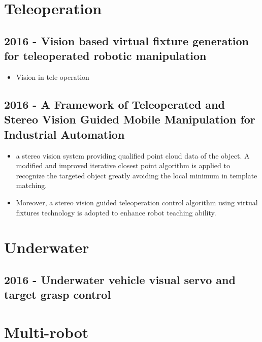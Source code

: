 \section{Teleoperation}
\subsection{2016 - Vision based virtual fixture generation for teleoperated robotic manipulation}
\begin{itemize}
\item Vision in tele-operation 
\end{itemize}

\subsection{2016 - A Framework of Teleoperated and Stereo Vision Guided Mobile Manipulation for Industrial Automation}
\begin{itemize}
\item  a stereo vision system providing qualified point cloud data of the object. A modified and improved iterative closest point algorithm is applied to recognize the targeted object greatly avoiding the local minimum in template matching.
\item Moreover, a stereo vision guided teleoperation control algorithm using virtual fixtures technology is adopted to enhance robot teaching ability.
\end{itemize}

\section{Underwater}
\subsection{2016 - Underwater vehicle visual servo and target grasp control}


\section{Multi-robot}

